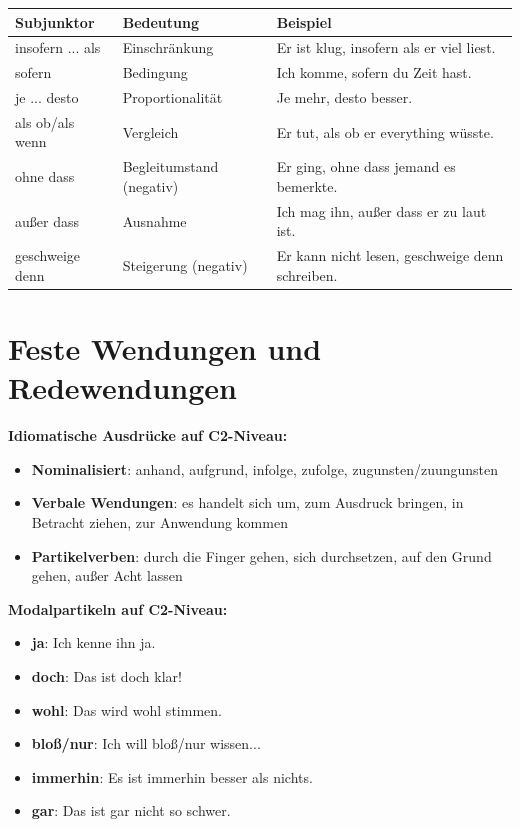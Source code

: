 \bigskip
\begin{center}
\begin{tabular}{|l|l|p{6cm}|}
\hline
Subjunktor & Bedeutung & Beispiel \\ \hline
insofern ... als & Einschränkung & Er ist klug, insofern als er viel liest. \\ \hline
sofern & Bedingung & Ich komme, sofern du Zeit hast. \\ \hline
je ... desto & Proportionalität & Je mehr, desto besser. \\ \hline
als ob/als wenn & Vergleich & Er tut, als ob er everything wüsste. \\ \hline
ohne dass & Begleitumstand (negativ) & Er ging, ohne dass jemand es bemerkte. \\ \hline
außer dass & Ausnahme & Ich mag ihn, außer dass er zu laut ist. \\ \hline
geschweige denn & Steigerung (negativ) & Er kann nicht lesen, geschweige denn schreiben. \\ \hline
\end{tabular}
\end{center}

\section{Feste Wendungen und Redewendungen}
\label{sec:C2Wendungen}

\bigskip
\noindent\textbf{Idiomatische Ausdrücke auf C2-Niveau:}

\begin{itemize}
    \item \textbf{Nominalisiert}: anhand, aufgrund, infolge, zufolge, zugunsten/zuungunsten
    \item \textbf{Verbale Wendungen}: es handelt sich um, zum Ausdruck bringen, in Betracht ziehen, zur Anwendung kommen
    \item \textbf{Partikelverben}: durch die Finger gehen, sich durchsetzen, auf den Grund gehen, außer Acht lassen
\end{itemize}

\bigskip
\noindent\textbf{Modalpartikeln auf C2-Niveau:}

\begin{itemize}
    \item \textbf{ja}: Ich kenne ihn ja.
    \item \textbf{doch}: Das ist doch klar!
    \item \textbf{wohl}: Das wird wohl stimmen.
    \item \textbf{bloß/nur}: Ich will bloß/nur wissen...
    \item \textbf{immerhin}: Es ist immerhin besser als nichts.
    \item \textbf{gar}: Das ist gar nicht so schwer.
\end{itemize}

